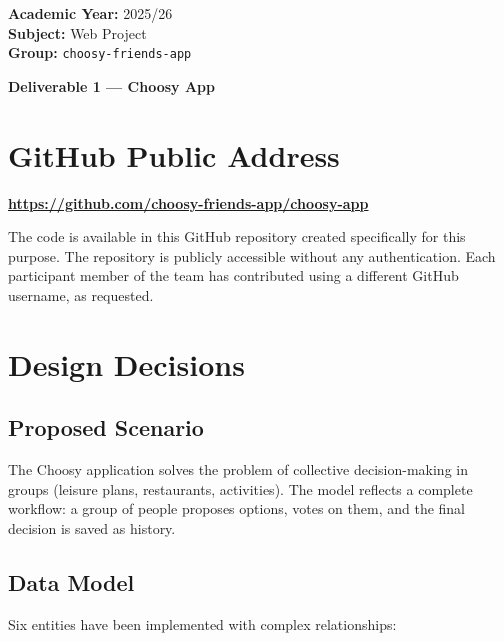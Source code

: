 \documentclass[a4paper,11pt]{article}
\begin{document}
\begin{flushright}
    {\large \textbf{Academic Year:}} 2025/26 \\
    {\large \textbf{Subject:}} Web Project \\
    {\large \textbf{Group:}} \texttt{choosy-friends-app}
\end{flushright}

\vspace{1cm}

\begin{center}
    {\Huge \textbf{\color{primary} Deliverable 1 --- Choosy App}}
\end{center}

\vspace{1cm}

\section{GitHub Public Address}

\noindent\textbf{\url{https://github.com/choosy-friends-app/choosy-app}}

\vspace{0.5cm}
\noindent The code is available in this GitHub repository created specifically for this purpose. The repository is publicly accessible without any authentication. Each participant member of the team has contributed using a different GitHub username, as requested.

\section{Design Decisions}

\subsection{Proposed Scenario}
The Choosy application solves the problem of collective decision-making in groups (leisure plans, restaurants, activities). The model reflects a complete workflow: a group of people proposes options, votes on them, and the final decision is saved as history.

\subsection{Data Model}
Six entities have been implemented with complex relationships:
\end{document}
